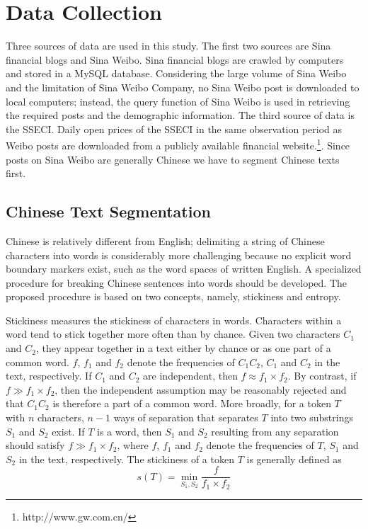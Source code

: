 \documentclass[review,3p,times,12pt,number]{elsarticle}
\begin{document}
\section{Data Collection}
\label{sec:weibo:dp}
Three sources of data are used in this study. The first two sources are Sina financial blogs and Sina Weibo. Sina financial blogs are crawled by computers and stored in a MySQL database. Considering the large volume of Sina Weibo and the limitation of Sina Weibo Company, no Sina Weibo post is downloaded to local computers; instead, the query function of Sina Weibo is used in retrieving the required posts and the demographic information. The third source of data is the SSECI. Daily open prices of the SSECI in the same observation period as Weibo posts are downloaded from a publicly available financial website.\footnote{http://www.gw.com.cn/}. Since posts on Sina Weibo are generally Chinese we have to segment Chinese texts first.

\subsection{Chinese Text Segmentation}
\label{sec:weibo:algo}
Chinese is relatively different from English; delimiting a string of Chinese characters into words is considerably more challenging because no explicit word boundary markers exist, such as the word spaces of written English. A specialized procedure for breaking Chinese sentences into words should be developed. The proposed procedure is based on two concepts, namely, stickiness and entropy.

Stickiness measures the stickiness of characters in words. Characters within a word tend to stick together more often than by chance. Given two characters $C_1$ and $C_2$, they appear together in a text either by chance or as one part of a common word. $f$, $f_1$ and $f_2$ denote the frequencies of $C_1C_2$, $C_1$ and $C_2$ in the text, respectively. If $C_1$ and $C_2$ are independent, then $f\approx f_1 \times f_2$. By contrast, if $f \gg f_1 \times f_2$, then the independent assumption may be reasonably rejected and that $C_1C_2$ is therefore a part of a common word. More broadly, for a token $T$ with $n$ characters, $n-1$ ways of separation that separates $T$ into two substrings $S_1$ and $S_2$ exist. If $T$ is a word, then $S_1$ and $S_2$ resulting from any separation should satisfy $f\gg f_1\times f_2$, where $f$, $f_1$ and $f_2$ denote the frequencies of $T$, $S_1$ and $S_2$ in the text, respectively.
The stickiness of a token $T$ is generally defined as
\begin{equation}
s(T)=\min_{S_1,S_2} \frac{f}{f_1\times f_2}
\end{equation}
\end{document}
